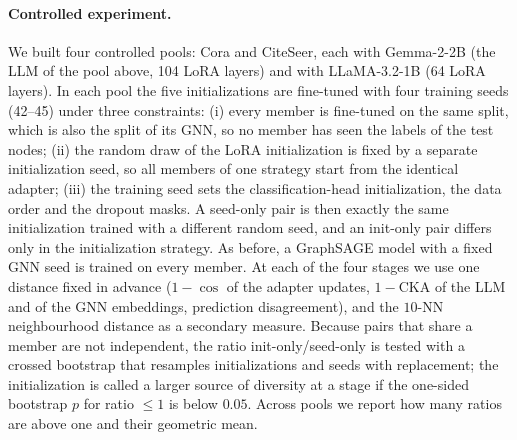 \documentclass[a4paper,fleqn]{cas-sc}
\DeclareRobustCommand{\revcommon}[2][]{\textcolor{revshared}{#2}} %
\begin{document}
\paragraph{\revcommon{Controlled experiment.}}
\revcommon[R1,R2,R4]{We built four controlled pools: Cora and CiteSeer, each with Gemma-2-2B (the LLM of the pool above, 104 LoRA layers) and with LLaMA-3.2-1B (64 LoRA layers). In each pool the five initializations are fine-tuned with four training seeds (42--45) under three constraints: (i) every member is fine-tuned on the same split, which is also the split of its GNN, so no member has seen the labels of the test nodes; (ii) the random draw of the LoRA initialization is fixed by a separate initialization seed, so all members of one strategy start from the identical adapter; (iii) the training seed sets the classification-head initialization, the data order and the dropout masks. A seed-only pair is then exactly the same initialization trained with a different random seed, and an init-only pair differs only in the initialization strategy. As before, a GraphSAGE model with a fixed GNN seed is trained on every member. At each of the four stages we use one distance fixed in advance ($1-\cos$ of the adapter updates, $1-$CKA of the LLM and of the GNN embeddings, prediction disagreement), and the $10$-NN neighbourhood distance as a secondary measure. Because pairs that share a member are not independent, the ratio init-only/seed-only is tested with a crossed bootstrap that resamples initializations and seeds with replacement; the initialization is called a larger source of diversity at a stage if the one-sided bootstrap $p$ for ratio $\leq1$ is below $0.05$. Across pools we report how many ratios are above one and their geometric mean.}
\end{document}
